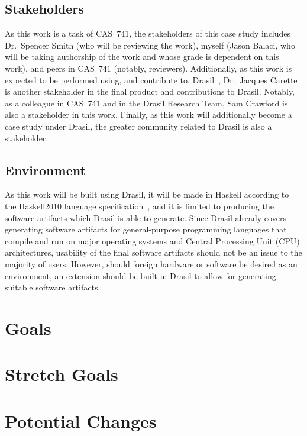 \documentclass{article}
\begin{document}
\subsection{Stakeholders}
\label{problem-statement:stakeholders}

As this work is a task of CAS\ $741$, the stakeholders of this case study
includes Dr.\ Spencer Smith (who will be reviewing the work), myself (Jason
Balaci, who will be taking authorship of the work and whose grade is dependent
on this work), and peers in CAS\ $741$ (notably, reviewers). Additionally, as
this work is expected to be performed using, and contribute to, Drasil\
\cite{Drasil2023}, Dr.\ Jacques Carette is another stakeholder in the final
product and contributions to Drasil. Notably, as a colleague in CAS\ 741 and in
the Drasil Research Team, Sam Crawford is also a stakeholder in this work.
Finally, as this work will additionally become a case study under Drasil, the
greater community related to Drasil is also a stakeholder.

\subsection{Environment}
\label{problem-statement:environment}

As this work will be built using Drasil, it will be made in Haskell according to
the Haskell2010 language specification\ \cite{Haskell2010}, and it is limited to
producing the software artifacts which Drasil is able to generate. Since Drasil
already covers generating software artifacts for general-purpose programming
languages that compile and run on major operating systems and Central Processing
Unit (CPU) architectures, usability of the final software artifacts should not
be an issue to the majority of users. However, should foreign hardware or
software be desired as an environment, an extension should be built in Drasil to
allow for generating suitable software artifacts.

\section{Goals}
\label{goals}

\section{Stretch Goals}
\label{goals:stretch-goals}

\section{Potential Changes}
\label{potential-changes}

\newpage

\printbibliography[heading=bibintoc]
\end{document}
